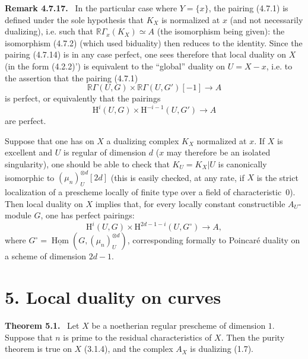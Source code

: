 \documentclass[11pt]{article}
\providecommand{\uHom}{\underline{\Hom}}
\newenvironment{statement}[1]{\par\medskip\noindent\textbf{#1.}\ }{\par\medskip}
\renewcommand{\H}{\mathrm{H}}
\DeclareMathOperator{\Hom}{Hom}
\providecommand{\Hom}{\operatorname{Hom}}
\providecommand{\Hom}{\operatorname{Hom}}
\begin{document}
\begin{statement}{Remark 4.7.17}
In the particular case where $Y=\{x\}$, the pairing (4.7.1) is defined under the sole hypothesis that $K_X$ is normalized at $x$ (and not necessarily dualizing), i.e. such that $\mathbb{R}\Gamma_x(K_X)\simeq A$ (the isomorphism being given): the isomorphism (4.7.2) (which used biduality) then reduces to the identity. Since the pairing (4.7.14) is in any case perfect, one sees therefore that local duality on $X$ (in the form (4.2.2)') is equivalent to the ``global'' duality on $U=X-x$, i.e. to the assertion that the pairing (4.7.1)
\[
\mathbb{R}\Gamma(U,G)\times\mathbb{R}\Gamma(U,G')[-1]\longrightarrow A
\]
is perfect, or equivalently that the pairings
\[
\H^i(U,G)\times\H^{-i-1}(U,G')\longrightarrow A
\]
are perfect.

Suppose that one has on $X$ a dualizing complex $K_X$ normalized at $x$. If $X$ is excellent and $U$ is regular of dimension $d$ ($x$ may therefore be an isolated singularity), one should be able to check that $K_U=K_X|U$ is canonically isomorphic to $(\mu_n)_U^{\otimes d}[2d]$ (this is easily checked, at any rate, if $X$ is the strict localization of a prescheme locally of finite type over a field of characteristic~$0$). Then local duality on $X$ implies that, for every locally constant constructible $A_U$-module $G$, one has perfect pairings:
\[
\H^i(U,G)\times\H^{2d-1-i}(U,G^\circ)\longrightarrow A,
\]
where $G^\circ=\uHom(G,(\mu_n)_U^{\otimes d})$, corresponding formally to Poincaré duality on a scheme of dimension $2d-1$.
\end{statement}

\section*{5. Local duality on curves}

\begin{statement}{Theorem 5.1}
Let $X$ be a noetherian regular prescheme of dimension $1$. Suppose that $n$ is prime to the residual characteristics of $X$. Then the purity theorem is true on $X$ (3.1.4), and the complex $A_X$ is dualizing (1.7).
\end{statement}
\end{document}
